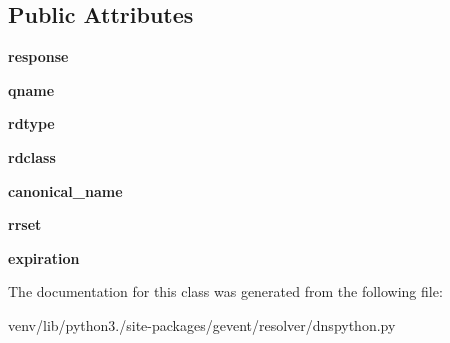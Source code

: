 \subsection*{Public Attributes}
\begin{DoxyCompactItemize}
\item 
\mbox{\label{classgevent_1_1resolver_1_1dnspython_1_1___hosts_answer_a2e80bc96b01df42a6db4bba142949499}} 
{\bfseries response}
\item 
\mbox{\label{classgevent_1_1resolver_1_1dnspython_1_1___hosts_answer_aaab95cd4a230230a33d2b73f665b4aec}} 
{\bfseries qname}
\item 
\mbox{\label{classgevent_1_1resolver_1_1dnspython_1_1___hosts_answer_a2e7b228822a5d5527397646004cac4a6}} 
{\bfseries rdtype}
\item 
\mbox{\label{classgevent_1_1resolver_1_1dnspython_1_1___hosts_answer_adb00bf2448c1050be475b1f389472a31}} 
{\bfseries rdclass}
\item 
\mbox{\label{classgevent_1_1resolver_1_1dnspython_1_1___hosts_answer_a961093924c5fb4a0797d40f014cb33d8}} 
{\bfseries canonical\+\_\+name}
\item 
\mbox{\label{classgevent_1_1resolver_1_1dnspython_1_1___hosts_answer_aa05b033f1243b80ce1bc1ce88976c8b8}} 
{\bfseries rrset}
\item 
\mbox{\label{classgevent_1_1resolver_1_1dnspython_1_1___hosts_answer_a73343c5fdd285e555b3ba04310f6e0ce}} 
{\bfseries expiration}
\end{DoxyCompactItemize}


The documentation for this class was generated from the following file\+:\begin{DoxyCompactItemize}
\item 
venv/lib/python3./site-\/packages/gevent/resolver/dnspython.\+py\end{DoxyCompactItemize}
